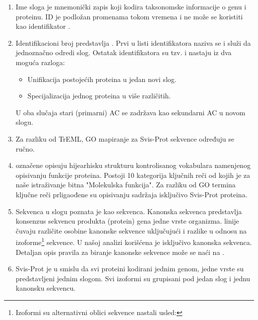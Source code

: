 \begin{enumerate}
  \item Ime sloga   je mnemonički zapis koji kodira
    taksonomske informacije o genu i proteinu. ID je podložan promenama tokom vremena
    i ne može se koristiti kao identifikator \parencite{www_svisprot}.
  \item Identifikacioni broj predstavlja  .
    Prvi u listi identifikatora naziva se  i služi da
    jednoznačno odredi slog. Ostatak identifikatora su tzv.  i
    nastaju iz dva moguća razloga: \parencite{svisprot2003, www_svisprot}
    \begin{itemize}
      \item Unifikacija postojećih proteina u jedan novi slog. 
      \item Specijalizacija jednog proteina u više različitih.
    \end{itemize}
    U oba slučaja stari (primarni) AC se zadržava kao sekundarni AC u novom slogu.

  \item Za razliku od TrEML, GO mapiranje za Svis-Prot sekvence određuju se ručno\parencite{www_svisprot}.

  \item {}  označene  opisuju
    hijearhisku strukturu kontrolisanog vokabulara namenjenog opisivanju
    funkcije proteina. Postoji 10 kategorija ključnih reči od kojih je za naše
    istraživanje bitna "Molekulska funkcija"\parencite{svisprot2003}.  Za razliku od GO termina ključne
    reči prligaođene su opisivanju sadržaja isključivo Svis-Prot proteina\parencite{www_svisprot}.

  \item Sekvenca  u slogu poznata je kao 
     sekvenca. Kanonska sekvenca predstavlja konsenzus sekvencu
    produkta (protein) gena jedne vrste organizma.  
    linije čuvaju različite osobine kanonske sekvence uključujući i razlike u
    odnosu na izoforme\footnote{Izoformi su alternativni oblici sekvence
      nastali usled:  } sekvence.  U našoj
    analizi korišćena je isključivo kanonska sekvenca. Detaljan opis pravila za
    biranje kanonske sekvence može se naći na \parencite{www_svisprot}.

  \item
    \label{red}
    Svis-Prot je  u smislu da svi proteini
    kodirani jednim genom, jedne vrste su predstavljeni jednim slogom. Svi
    izoformi su grupisani pod jedan slog i jednu kanonsku sekvencu.


\end{enumerate}

